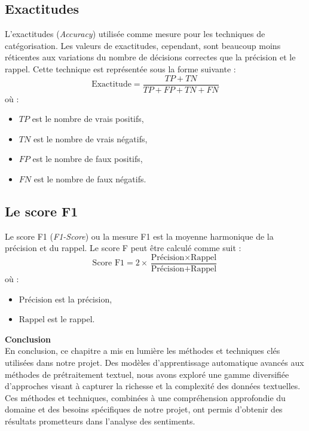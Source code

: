 \subsection{Exactitudes}
L’exactitudes (\textit{Accuracy})  \cite{sebastiani2002text} utilisée comme mesure pour les techniques de catégorisation. Les valeurs de exactitudes, cependant, sont beaucoup moins réticentes aux variations du nombre de décisions correctes que la précision et le rappel. Cette technique est
représentée sous la forme suivante :
\begin{equation}
\text{Exactitude} = \frac{TP + TN}{TP + FP + TN + FN}
\end{equation}
où :
\begin{itemize}
  \item $TP$ est le nombre de vrais positifs,
  \item $TN$ est le nombre de vrais négatifs,
  \item $FP$ est le nombre de faux positifs,
  \item $FN$ est le nombre de faux négatifs.
\end{itemize}


\subsection{Le score F1}
Le score F1 (\textit{F1-Score}) ou la mesure F1 \cite{vilares2015lexicon} est la moyenne harmonique de la précision et du rappel. Le score F peut être calculé comme suit :
\begin{equation}
\text{Score F1} = 2 \times \frac{\text{Précision} \times \text{Rappel}}{\text{Précision} + \text{Rappel}}
\end{equation}
où :
\begin{itemize}
  \item $\text{Précision}$ est la précision,
  \item $\text{Rappel}$ est le rappel.
\end{itemize}
\vspace{0.5cm}
\textbf{Conclusion}\\
En conclusion, ce chapitre a mis en lumière les méthodes et techniques clés utilisées dans notre projet. Des modèles d'apprentissage automatique avancés aux méthodes de prétraitement textuel, nous avons exploré une gamme diversifiée d'approches visant à capturer la richesse et la complexité des données textuelles. Ces méthodes et techniques, combinées à une compréhension approfondie du domaine et des besoins spécifiques de notre projet, ont permis d'obtenir des résultats prometteurs dans l'analyse des sentiments.






